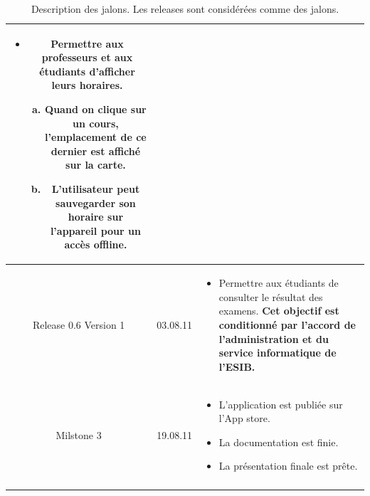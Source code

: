 \begin{longtable}{|c|l|p{10cm}|}
 	 		 	\begin{itemize}
 	 		 	 		\item Permettre aux professeurs et aux étudiants d'afficher leurs horaires.
 		 		 	 	\begin{enumerate}[a)]
 		 		 	 			\item Quand on clique sur un cours, l'emplacement de ce dernier est affiché sur la carte.
 		 		 	 			\item L'utilisateur peut sauvegarder son horaire sur l'appareil pour un accès offline.
 		 		 	 		\end{enumerate}
 	 		 	\end{itemize}   \\ 
	 	\hline  Release 0.6 Version 1 & 03.08.11  & 
 		 	\begin{itemize}
 		 	 		\item Permettre aux étudiants de consulter le résultat des examens. \textbf{Cet objectif est conditionné par l'accord de l'administration et du service informatique de l'\gls{ESIB}.}
 		 	\end{itemize}   \\  
	 	\hline  Milstone 3 &  19.08.11 &
	  		 	\begin{itemize}
	  		 	 		\item L'application est publiée sur l'App store.
	  		 	 		\item La documentation est finie.
	  		 	 		\item La présentation finale est prête.
	  		 	\end{itemize}   \\  
		 \hline 
		\caption{\label{tab.DescMils}Description des jalons. Les releases sont considérées comme des jalons.} \label{grid_mlmmh} \\
	 \end{longtable} 

